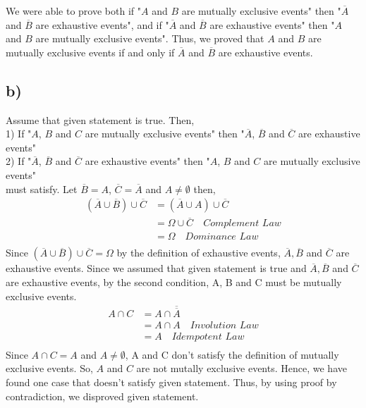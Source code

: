 \documentclass[12pt]{article}
\begin{document}
We were able to prove both if "$A$ and $B$ are mutually exclusive events" then  "$\overline{A}$ and $\overline{B}$ are exhaustive events", and if "$\overline{A}$ and $\overline{B}$ are exhaustive events" then "$A$ and $B$ are mutually exclusive events". Thus, we proved that $A$ and $B$ are mutually exclusive events if and only if $\overline{A}$ and
$\overline{B}$ are exhaustive events.


\subsection*{b)}
Assume that given statement is true.
Then, \\
1) If "$A$, $B$ and $C$ are mutually exclusive events" then "$\overline{A}$,
$\overline{B}$ and $\overline{C}$ are exhaustive events" \\
2) If "$\overline{A}$,
$\overline{B}$ and $\overline{C}$ are exhaustive events" then "$A$, $B$ and $C$ are mutually exclusive events" \\
must satisfy.
Let $\overline{B} = A$, $ \overline{C} = \overline{A} $ and $A \neq \emptyset$ then, 
\begin{equation*} 
\begin{split}
(\overline{A} \cup \overline{B})\cup \overline{C} & = (\overline{A} \cup A) \cup \overline{C} \\
& = \Omega \cup \overline{C} \quad \textit{Complement Law} \\
& =  \Omega \quad \textit{Dominance Law} \\
\end{split}
\end{equation*}
Since $(\overline{A} \cup \overline{B})\cup \overline{C} = \Omega$ by the definition of exhaustive events, $\overline{A}, \overline{B}$ and $\overline{C}$ are exhaustive events. Since we assumed that given statement is true and $\overline{A}, \overline{B}$ and $\overline{C}$ are exhaustive events, by the second condition,  A, B and C must be mutually exclusive events. 
\begin{equation*} 
\begin{split}
A \cap C & = A \cap  \overline{\overline{A}}\  \\
& = A \cap A \quad \textit{Involution Law} \\
& =  A \quad \textit{Idempotent Law} \\
\end{split}
\end{equation*}
Since $A \cap C = A$ and $A \neq  \emptyset$, A and C don't satisfy the definition of mutually exclusive events. So, $A$ and $C$ are not mutally exclusive events. Hence, we have found one case that doesn't satisfy given statement. Thus, by using proof by contradiction, we disproved given statement.
\end{document}
